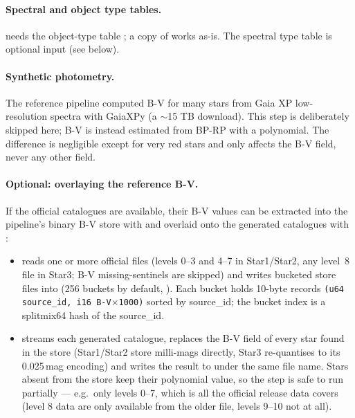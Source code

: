 \paragraph{Spectral and object type tables.}  needs the
object-type table ; a copy of  works as-is. The spectral type table  is optional input
(see  below).
\paragraph{Synthetic photometry.} The reference pipeline computed B-V for
many stars from Gaia XP low-resolution spectra with GaiaXPy (a $\sim$15 TB
download). This step is deliberately skipped here; B-V is instead estimated
from BP-RP with a polynomial. The difference is negligible except for very
red stars and only affects the B-V field, never any other field.

\paragraph{Optional: overlaying the reference B-V.} If the official
catalogues are available, their B-V values can be extracted into the
pipeline's binary B-V store with  and overlaid onto the
generated catalogues with :

\begin{itemize}
  \item {} reads one or more official
         files (levels 0--3 and 4--7 in Star1/Star2, any
        level~8 file in Star3; B-V missing-sentinels are skipped) and writes
        bucketed store files  into 
        (256 buckets by default, ). Each bucket holds
        10-byte records \texttt{(u64 source\_id, i16 B-V$\times$1000)}
        sorted by source\_id; the bucket index is a splitmix64 hash of the
        source\_id.
  \item {} streams each
        generated catalogue, replaces the B-V field of every star found in
        the store (Star1/Star2 store milli-mags directly, Star3 re-quantises
        to its 0.025\,mag encoding) and writes the result to
         under the same file name. Stars absent from
        the store keep their polynomial value, so the step is safe to run
        partially --- e.g.\ only levels 0--7, which is all the official
        release data covers (level 8 data are only available from the older
         file, levels 9--10 not at all).
\end{itemize}

